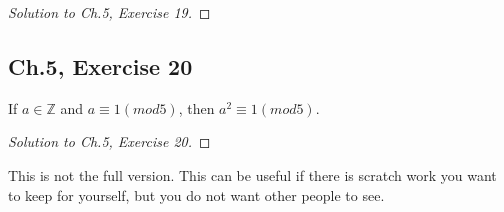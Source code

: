 \documentclass[12pt]{amsart}
\numberwithin{equation}{section}
\theoremstyle{definition}
\theoremstyle{remark}
\newif\ifnotes
\begin{document}
\begin{proof}[Solution to Ch.5,  Exercise 19]

\end{proof}



\subsection*{Ch.5,  Exercise 20}  If $ a \in \mathbb{Z} $ and $ a \equiv 1(mod 5) $, then $ a^2 \equiv 1(mod 5) $.



\begin{proof}[Solution to Ch.5,  Exercise 20]

\end{proof}


\ifnotes


\else
	This is not the full version.  This can be useful if there is scratch work you want to keep for yourself, but you do not want other people to see. 
\fi





\end{document}
